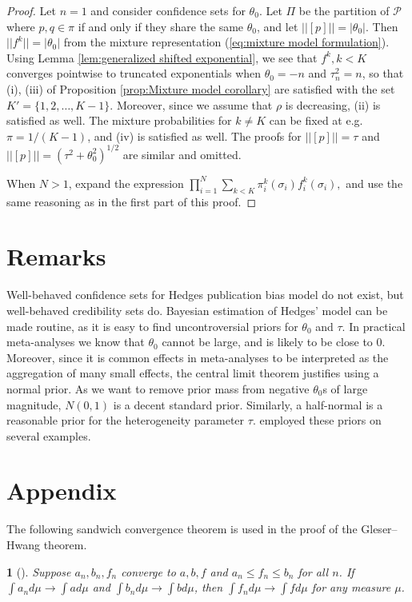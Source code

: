 \documentclass[article]{ajs}
\numberwithin{equation}{section}
\numberwithin{figure}{section}
\theoremstyle{plain}
\theoremstyle{definition}
\theoremstyle{definition}
\theoremstyle{plain}
\newtheorem{lem}[thm]{\protect\lemmaname}
\providecommand{\lemmaname}{Lemma}
\renewcommand{\sqrt}[1]{{(#1)^{1/2}}}
\begin{document}
\begin{proof}
\label{proof:general publication bias} Let $n=1$ and consider confidence sets for $\theta_{0}$. Let $\Pi$ be the partition of $\mathcal{P}$ where $p,q\in\pi$ if and only if they share the same $\theta_{0}$, and let $||[p]||=|\theta_{0}|$. Then $||f^{k}||=|\theta_{0}|$ from the mixture representation (\ref{eq:mixture model formulation}). Using Lemma \ref{lem:generalized shifted exponential}, we see that $f^{k},k<K$ converges pointwise to truncated exponentials when $\theta_{0}=-n$ and $\tau_n^{2} = n$, so that (i), (iii) of Proposition \ref{prop:Mixture model corollary} are satisfied with the set $K'=\{1,2,\ldots, K-1\}$. Moreover, since we assume that $\rho$ is decreasing, (ii) is satisfied as well. The mixture probabilities for $k \neq K$ can be fixed at e.g. $\pi=1/(K-1)$, and (iv) is satisfied as well. The proofs for $||[p]||=\tau$ and $||[p]||=\sqrt{\tau^{2}+\theta_{0}^{2}}$ are similar and omitted. 

When $N>1$, expand the expression $\prod_{i=1}^{N}\sum_{k<K}\pi_{i}^{k}(\sigma_{i})f_{i}^{k}(\sigma_{i}),$ and use the same reasoning as in the first part of this proof.
\end{proof}



\section{Remarks}

Well-behaved confidence sets for Hedges publication bias model do
not exist, but well-behaved credibility sets do. Bayesian estimation
of Hedges' model can be made routine, as it is easy to find uncontroversial
priors for $\theta_{0}$ and $\tau$. In practical meta-analyses we
know that $\theta_{0}$ cannot be large, and is likely to be close
to $0$. Moreover, since it is common effects in meta-analyses to
be interpreted as the aggregation of many small effects, the central
limit theorem justifies using a normal prior. As we want to remove
prior mass from negative $\theta_{0}$s of large magnitude, $N(0,1)$
is a decent standard prior. Similarly, a half-normal is a reasonable
prior for the heterogeneity parameter $\tau$. \citet{moss2019modelling}
employed these priors on several examples. 

\section*{Appendix}

The following sandwich convergence theorem is used in the proof of
the Gleser--Hwang theorem. 
\begin{lem}[{\citet[Exercise 16.4(a)]{billingsley1995probability}}]
\label{lem:Dominated covergence theorem} Suppose $a_{n},b_{n},f_{n}$
converge to $a,b,f$ and $a_{n}\leq f_{n}\leq b_{n}$ for all $n$.
If $\int a_{n}d\mu\to\int ad\mu$ and $\int b_{n}d\mu\to\int bd\mu$,
then $\int f_{n}d\mu\to\int fd\mu$ for any measure $\mu$.
\end{lem}
\end{document}
